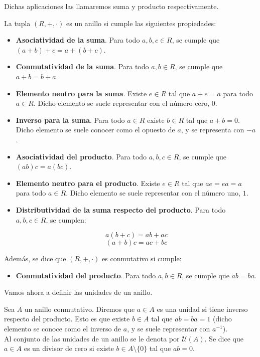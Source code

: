 Dichas aplicaciones las llamaremos suma y producto respectivamente.

\begin{definicion}
	La tupla $(R, +, \cdot)$ es un anillo si cumple las siguientes propiedades:
	
	\begin{itemize}
		\item \textbf{Asociatividad de la suma}. Para todo $a, b, c \in R$, se cumple que $(a + b) + c = a + (b + c)$.
		
		\item \textbf{Conmutatividad de la suma}. Para todo $a, b \in R$, se cumple que $a + b = b + a$.
		
		\item \textbf{Elemento neutro para la suma}. Existe $e \in R$ tal que $a + e = a$ para todo $a \in R$. Dicho elemento se suele representar con el número cero, $0$.
		
		\item \textbf{Inverso para la suma}. Para todo $a \in R$ existe $b \in R$ tal que $a + b = 0$. Dicho elemento se suele conocer como el opuesto de $a$, y se representa con $-a$.
		
		\item \textbf{Asociatividad del producto}. Para todo $a, b, c \in R$, se cumple que $(ab)c = a(bc)$.
		
		\item \textbf{Elemento neutro para el producto}. Existe $e \in R$ tal que $ae = ea = a$ para todo $a \in R$. Dicho elemento se suele representar con el número uno, $1$.
		
		\item \textbf{Distributividad de la suma respecto del producto}. Para todo $a, b, c \in R$, se cumplen:
		
		\[ a(b + c) = ab + ac \]
		\[ (a + b)c = ac + bc \]
	\end{itemize}
	
	Además, se dice que $(R, +, \cdot)$ es conmutativo si cumple:
	
	\begin{itemize}
		\item \textbf{Conmutatividad del producto}. Para todo $a, b \in R$, se cumple que $ab = ba$.
	\end{itemize}
\end{definicion}

Vamos ahora a definir las unidades de un anillo.

\begin{definicion}
	Sea $A$ un anillo conmutativo. Diremos que $a \in A$ es una unidad si tiene inverso respecto del producto. Esto es que existe $b \in A$ tal que $ab = ba = 1$ (dicho elemento se conoce como el inverso de $a$, y se suele representar con $a^{-1}$).\\
	
	Al conjunto de las unidades de un anillo se le denota por $\mathcal{U}(A)$. Se dice que $a \in A$ es un divisor de cero si existe $b \in A \setminus \{0\}$ tal que $ab = 0$.
\end{definicion}

